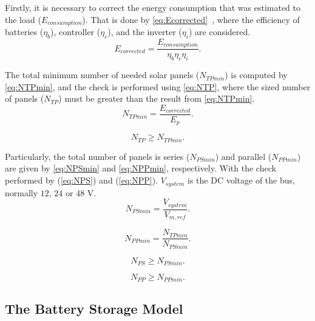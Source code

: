 \documentclass[journal]{IEEEtran}
\begin{document}
Firstly, it is necessary to correct the energy consumption that was estimated to the load ($E_{consumption}$). That is done by \eqref{eq:Ecorrected}~\cite{Pinho}, where the efficiency of batteries ($\eta_{b}$), controller ($\eta_{c}$), and the inverter ($\eta_{i}$) are considered.
\begin{equation}
\label{eq:Ecorrected}
E_{corrected} = \dfrac{E_{consumption}}{ \eta_{b} \eta_{c} \eta_{i} }.
\end{equation}

The total minimum number of needed solar panels ($N_{TPmin}$) is computed by \eqref{eq:NTPmin}, and the check is performed using \eqref{eq:NTP}, where the sized number of panels ($ N_{TP} $) must be greater than the result from \eqref{eq:NTPmin}.
\begin{equation}
\label{eq:NTPmin}
N_{TPmin} = \dfrac{E_{corrected}}{E_{p}}.
\end{equation}

\begin{equation}
\label{eq:NTP}
N_{TP} \geq N_{TPmin}.
\end{equation}

Particularly, the total number of panels is series ($N_{PSmin}$) and parallel ($N_{PPmin}$) are given by \eqref{eq:NPSmin} and \eqref{eq:NPPmin}, respectively. With the check performed by (\ref{eq:NPS}) and (\ref{eq:NPP}). $ V_{system} $ is the DC voltage of the bus, normally $12$, $24$ or $48$ V.
\begin{equation}
\label{eq:NPSmin}
N_{PSmin} = \dfrac{V_{system}}{V_{m,ref}}.
\end{equation}

\begin{equation}
\label{eq:NPPmin}
N_{PPmin} = \dfrac{N_{TPmin}}{N_{PSmin}}.
\end{equation}

\begin{equation}
\label{eq:NPS}
N_{PS} \geq N_{PSmin}.
\end{equation}

\begin{equation}
\label{eq:NPP}
N_{PP} \geq N_{PPmin}.
\end{equation}

\subsection{The Battery Storage Model }
\label{sec:BATmodel}
\end{document}

